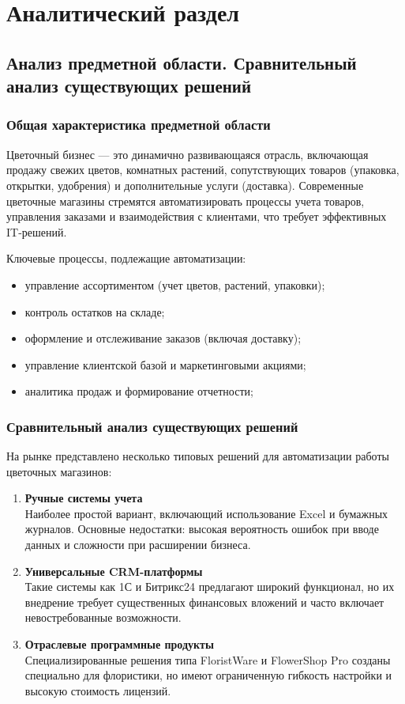 \chapter{Аналитический раздел}
\section*{Анализ предметной области. Сравнительный анализ существующих решений}
\subsection*{Общая характеристика предметной области}
Цветочный бизнес — это динамично развивающаяся отрасль, включающая продажу свежих цветов, комнатных растений, сопутствующих товаров (упаковка, открытки, удобрения) и дополнительные услуги (доставка). Современные цветочные магазины стремятся автоматизировать процессы учета товаров, управления заказами и взаимодействия с клиентами, что требует эффективных IT-решений.

Ключевые процессы, подлежащие автоматизации:
\begin{itemize}
	\item управление ассортиментом (учет цветов, растений, упаковки);
	\item контроль остатков на складе;
	\item оформление и отслеживание заказов (включая доставку);
	\item управление клиентской базой и маркетинговыми акциями;
	\item аналитика продаж и формирование отчетности;
\end{itemize}

\subsection*{Сравнительный анализ существующих решений}

На рынке представлено несколько типовых решений для автоматизации работы цветочных магазинов:

\begin{enumerate}
\item \textbf{Ручные системы учета} \\
Наиболее простой вариант, включающий использование Excel и бумажных журналов. Основные недостатки: высокая вероятность ошибок при вводе данных и сложности при расширении бизнеса.

\item \textbf{Универсальные CRM-платформы} \\
Такие системы как 1С и Битрикс24 предлагают широкий функционал, но их внедрение требует существенных финансовых вложений и часто включает невостребованные возможности.

\item \textbf{Отраслевые программные продукты} \\
Специализированные решения типа FloristWare и FlowerShop Pro созданы специально для флористики, но имеют ограниченную гибкость настройки и высокую стоимость лицензий.
\end{enumerate}


